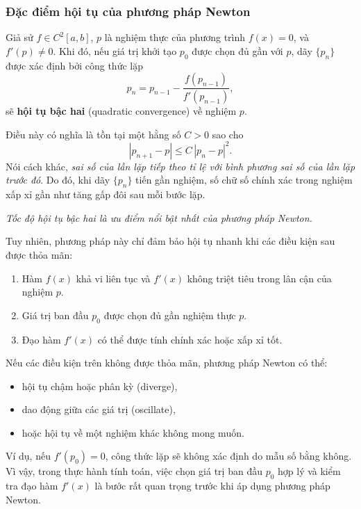 \subsubsection*{Đặc điểm hội tụ của phương pháp Newton}

Giả sử $f \in C^2[a,b]$, $p$ là nghiệm thực của phương trình $f(x) = 0$, 
và $f'(p) \neq 0$. Khi đó, nếu giá trị khởi tạo $p_0$ được chọn đủ gần với $p$, 
dãy $\{p_n\}$ được xác định bởi công thức lặp
\[
    p_{n} = p_{n-1} - \frac{f(p_{n-1})}{f'(p_{n-1})},
\]
sẽ \textbf{hội tụ bậc hai} (quadratic convergence) về nghiệm $p$.

Điều này có nghĩa là tồn tại một hằng số $C > 0$ sao cho
\[
    |p_{n+1} - p| \leq C\,|p_n - p|^2.
\]
Nói cách khác, \emph{sai số của lần lặp tiếp theo tỉ lệ với bình phương sai số của lần lặp trước đó}. 
Do đó, khi dãy $\{p_n\}$ tiến gần nghiệm, số chữ số chính xác trong nghiệm xấp xỉ gần như tăng gấp đôi sau mỗi bước lặp.

\begin{center}
\textit{Tốc độ hội tụ bậc hai là ưu điểm nổi bật nhất của phương pháp Newton.}
\end{center}

Tuy nhiên, phương pháp này chỉ đảm bảo hội tụ nhanh khi các điều kiện sau được thỏa mãn:
\begin{enumerate}
    \item Hàm $f(x)$ khả vi liên tục và $f'(x)$ không triệt tiêu trong lân cận của nghiệm $p$.
    \item Giá trị ban đầu $p_0$ được chọn đủ gần nghiệm thực $p$.
    \item Đạo hàm $f'(x)$ có thể được tính chính xác hoặc xấp xỉ tốt.
\end{enumerate}

Nếu các điều kiện trên không được thỏa mãn, phương pháp Newton có thể:
\begin{itemize}
    \item hội tụ chậm hoặc phân kỳ (diverge),
    \item dao động giữa các giá trị (oscillate),
    \item hoặc hội tụ về một nghiệm khác không mong muốn.
\end{itemize}

\noindent
Ví dụ, nếu $f'(p_0) = 0$, công thức lặp sẽ không xác định do mẫu số bằng không. Vì vậy, trong thực hành tính toán, việc chọn giá trị ban đầu $p_0$ hợp lý và kiểm tra đạo hàm $f'(x)$ là bước rất quan trọng trước khi áp dụng phương pháp Newton.

